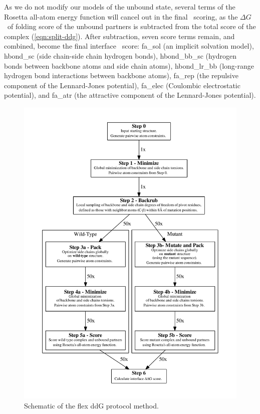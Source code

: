 As we do not modify our models of the unbound state, several terms of the Rosetta all-atom energy function will cancel out in the final \ddg\ scoring, as the $\Delta G$\ of folding score of the unbound partners is subtracted from the total score of the complex (\cref{eqn:split-ddg}). After subtraction, seven score terms remain, and combined, become the final interface \ddg\ score: fa\_sol (an implicit solvation model\cite{lazaridis_effective_1999}), hbond\_sc (side chain-side chain hydrogen bonds\cite{kortemme_orientation-dependent_2003,leaver-fay_chapter_2013,song_structure-guided_2011,omeara_combined_2015}), hbond\_bb\_sc (hydrogen bonds between backbone atoms and side chain atoms\cite{kortemme_orientation-dependent_2003,leaver-fay_chapter_2013,song_structure-guided_2011,omeara_combined_2015}), hbond\_lr\_bb (long-range hydrogen bond interactions between backbone atoms\cite{kortemme_orientation-dependent_2003,leaver-fay_chapter_2013,song_structure-guided_2011,omeara_combined_2015}), fa\_rep (the repulsive component of the Lennard-Jones potential\cite{leaver-fay_chapter_2013}), fa\_elec (Coulombic electrostatic potential\cite{leaver-fay_chapter_2013}), and fa\_atr (the attractive component of the Lennard-Jones potential\cite{leaver-fay_chapter_2013}).


\begin{figure}
  \centering
  \includegraphics[width=\textwidth,keepaspectratio]{figures/fig-overview.pdf}
    \caption[]{
      Schematic of the flex ddG protocol method.
  } \label{fig:figure-overview}
\end{figure}

